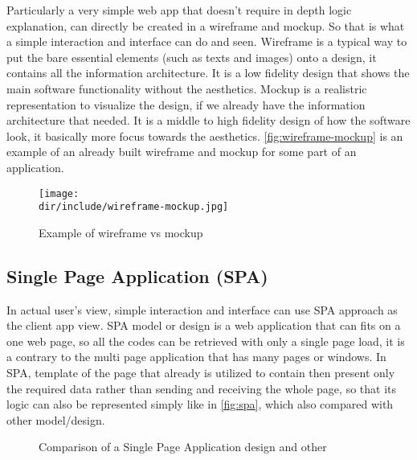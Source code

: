 Particularly a very simple web app that doesn't require in depth logic explanation, can directly be created in a wireframe and mockup.
So that is what a simple interaction and interface can do and seen.
Wireframe is a typical way to put the bare essential elements (such as texts and images) onto a design, it contains all the information architecture.
It is a low fidelity design that shows the main software functionality without the aesthetics.
Mockup is a realistric representation to visualize the design, if we already have the information architecture that needed.
It is a middle to high fidelity design of how the software look, it basically more focus towards the aesthetics.
\autoref{fig:wireframe-mockup} is an example of an already built wireframe and mockup for some part of an application.

\begin{figure}[htbp]
    \centering
    \texttt{[image: \\dir/include/wireframe-mockup.jpg]}
    \caption[Wireframe vs Mockup Example]{Example of wireframe vs mockup \autocite{Trentini2015WM}}
    \label{fig:wireframe-mockup}
\end{figure}

\subsection{Single Page Application (SPA)}
\label{ssec:spa}

In actual user's view, simple interaction and interface can use \ac{SPA} approach as the client app view.
\ac{SPA} model or design is a web application that can fits on a one web page, so all the codes can be retrieved with only a single page load, it is a contrary to the multi page application that has many pages or windows.
In \ac{SPA}, template of the page that already is utilized to contain then present only the required data rather than sending and receiving the whole page, so that its logic can also be represented simply like in \autoref{fig:spa}, which also compared with other model/design.

\begin{figure}[htbp]
    \centering
    \caption[Single Page Application design comparison]{Comparison of a Single Page Application design and other}
    \label{fig:spa}
\end{figure}
